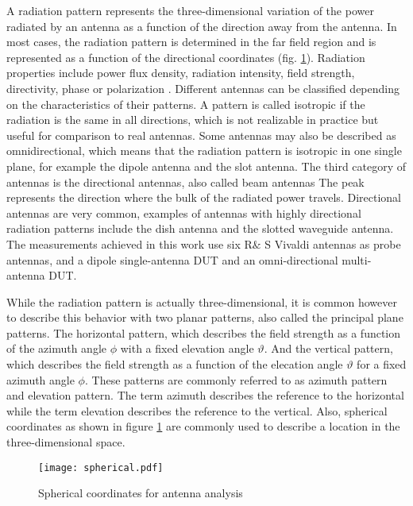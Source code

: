 A radiation pattern represents the three-dimensional variation of the power radiated by an antenna as a function of the direction away from the antenna. In most cases, the radiation pattern is determined in the far field region and is represented as a function of the directional coordinates (fig. \ref{spherical}). Radiation properties include power flux density, radiation intensity, field strength, directivity, phase or polarization \cite{balanis}. Different antennas can be classified depending on the characteristics of their patterns. A pattern is called isotropic if the radiation is the same in all directions, which is not realizable in practice but useful for comparison to real antennas. Some antennas may also be described as omnidirectional, which means that the radiation pattern is isotropic in one single plane, for example the dipole antenna and the slot antenna. The third category of antennas is the directional antennas, also called beam antennas The peak represents the direction where the bulk of the radiated power travels. Directional antennas are very common, examples of antennas with highly directional radiation patterns include the  dish antenna and the slotted waveguide antenna. The measurements achieved in this work use six R$\&$ S Vivaldi antennas as probe antennas, and a dipole single-antenna DUT and an omni-directional multi-antenna DUT.

While the radiation pattern is actually three-dimensional, it is common however to describe this behavior with two planar patterns, also called the principal plane patterns. The horizontal pattern, which describes the field strength as a function of the azimuth angle $\phi$  with a fixed elevation angle $ \vartheta$. And the vertical pattern, which describes the field strength as a function of the elecation angle $\vartheta$  for a fixed azimuth angle $\phi$. These patterns are commonly referred to as azimuth pattern and elevation pattern. The term azimuth describes the reference to the horizontal while the term elevation describes the reference to the vertical. Also, spherical coordinates as shown in figure \ref{spherical} are commonly used to describe a location in the three-dimensional space.

\begin{figure}[H]
\vspace{-2cm} 

	\begin{center}
		\texttt{[image: spherical.pdf]}
			\vspace{-2cm} 	\caption{\label{spherical}Spherical coordinates for antenna analysis \cite{balanis}}
	\end{center}
 \vspace{-1cm} 

\end{figure}
